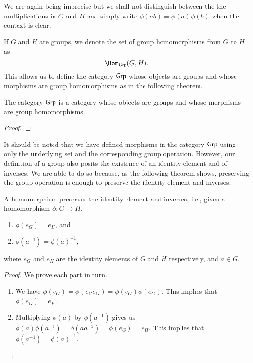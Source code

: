 \begin{remark}
    We are again being imprecise but we shall not distinguish between the the multiplications in \(G\) and \(H\) and simply write \(\phi(ab) = \phi(a)\phi(b)\) when the context is clear.
\end{remark}

\begin{definition}
    If \(G\) and \(H\) are groups, we denote the set of group homomorphisms from \(G\) to \(H\) as
    \[
        \Hom_{\Grp}(G, H).
    \]
    This allows us to define the category \(\mathsf{Grp}\) whose objects are groups and whose morphisms are group homomorphisms as in the following theorem.
\end{definition}

\begin{theorem}
    The category \(\mathsf{Grp}\) is a category whose objects are groups and whose morphisms are group homomorphisms.
\end{theorem}

\begin{proof}
    
\end{proof}

\begin{sectionthm}
    It should be noted that we have defined morphisms in the category \(\mathsf{Grp}\) using only the underlying set and the corresponding group operation. However, our definition of a group also posits the existence of an identity element and of inverses. We are able to do so because, as the following theorem shows, preserving the group operation is enough to preserve the identity element and inverses.
\end{sectionthm}

\begin{theorem}
    A homomorphism preserves the identity element and inverses, i.e., given a homomorphism \(\phi: G \to H\),
    \begin{enumerate}[label=(\alph*)]
        \item \(\phi(e_G) = e_H\), and
        \item \(\phi(a^{-1}) = \phi(a)^{-1}\),
    \end{enumerate}
    where \(e_G\) and \(e_H\) are the identity elements of \(G\) and \(H\) respectively, and \(a \in G\).
\end{theorem}

\begin{proof}
    We prove each part in turn.

    \begin{enumerate}[label=(\alph*), wide]
        \item We have \(\phi(e_G) = \phi(e_G e_G) = \phi(e_G) \phi(e_G)\). This implies that \(\phi(e_G) = e_H\).
        \item Multiplying \(\phi(a)\) by \(\phi(a^{-1})\) gives us \(\phi(a)\phi(a^{-1}) = \phi(aa^{-1}) = \phi(e_G) = e_H\). This implies that \(\phi(a^{-1}) = \phi(a)^{-1}\).
    \end{enumerate}
\end{proof}

